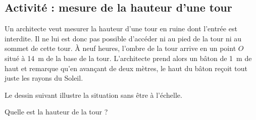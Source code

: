 
\subsection*{Activité : mesure de la hauteur d'une tour}

Un architecte veut mesurer la hauteur d'une tour en ruine dont l'entrée est interdite. Il ne lui est donc pas possible d'accéder ni au pied de la tour ni au sommet de cette tour. À neuf heures, l'ombre de la tour arrive en un point \( O\) situé à \SI{14}{\meter} de la base de la tour. L'architecte prend alors un bâton de \SI{1}{\meter} de haut et remarque qu'en avançant de deux mètres, le haut du bâton reçoit tout juste les rayons du Soleil.

Le dessin suivant illustre la situation sans être à l'échelle.

\begin{center}
   
\end{center}

Quelle est la hauteur de la tour ?
